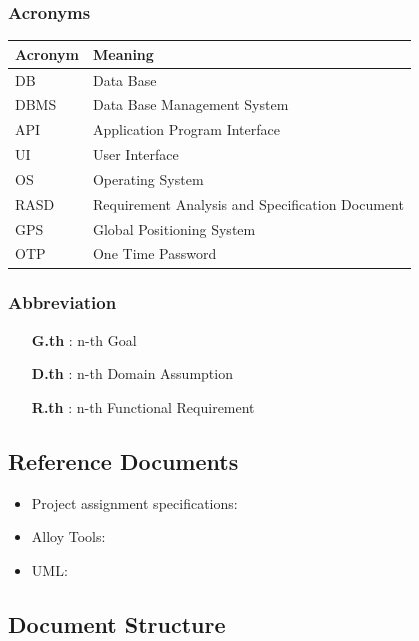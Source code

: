 \subsubsection{Acronyms}

\begin{tabular}{|l|l|}
    \hline
    Acronym & Meaning \\ \hline
    DB & Data Base \\ \hline
    DBMS & Data Base Management System \\ \hline
    API & Application Program Interface \\ \hline
    UI & User Interface \\ \hline
    OS & Operating System \\ \hline
    RASD & Requirement Analysis and Specification Document \\ \hline
    GPS & Global Positioning System \\ \hline
    OTP & One Time Password \\ 
    \hline
\end{tabular}

\subsubsection{Abbreviation}

\begin{itemize}
    \item [\textbf{G.th}]: n-th Goal
    \item [\textbf{D.th}]: n-th Domain Assumption
    \item [\textbf{R.th}]: n-th Functional Requirement
\end{itemize}

\subsection{Reference Documents}

\begin{itemize}
    \item Project assignment specifications:\cite{ASSIGNMENT}
    \item Alloy Tools: \cite{ALLOY}
    \item UML: \cite{UML}
\end{itemize}

\subsection{Document Structure}

